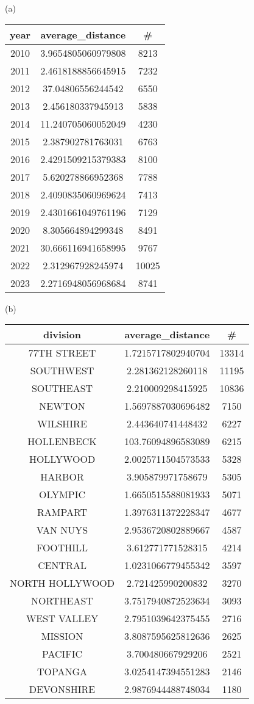 \documentclass{article}
\begin{document}
\begin{center}
(a)
\begin{tabular}{|c|c|c|}
\hline
\textbf{year} & \textbf{average\_distance} & \textbf{\#} \\
\hline
2010 & 3.9654805060979808 & 8213 \\
2011 & 2.4618188856645915 & 7232 \\
2012 & 37.04806556244542 & 6550 \\
2013 & 2.456180337945913 & 5838 \\
2014 & 11.240705060052049 & 4230 \\
2015 & 2.387902781763031 & 6763 \\
2016 & 2.4291509215379383 & 8100 \\
2017 & 5.620278866952368 & 7788 \\
2018 & 2.4090835060969624 & 7413 \\
2019 & 2.4301661049761196 & 7129 \\
2020 & 8.305664894299348 & 8491 \\
2021 & 30.666116941658995 & 9767 \\
2022 & 2.312967928245974 & 10025 \\
2023 & 2.2716948056968684 & 8741 \\
\hline
\end{tabular}
\quad
(b)
\begin{tabular}{|c|c|c|}
\hline
\textbf{division} & \textbf{average\_distance} & \textbf{\#} \\
\hline
77TH STREET & 1.7215717802940704 & 13314 \\
SOUTHWEST & 2.281362128260118 & 11195 \\
SOUTHEAST & 2.210009298415925 & 10836 \\
NEWTON & 1.5697887030696482 & 7150 \\
WILSHIRE & 2.443640741448432 & 6227 \\
HOLLENBECK & 103.76094896583089 & 6215 \\
HOLLYWOOD & 2.0025711504573533 & 5328 \\
HARBOR & 3.905879971758679 & 5305 \\
OLYMPIC & 1.6650515588081933 & 5071 \\
RAMPART & 1.3976311372228347 & 4677 \\
VAN NUYS & 2.9536720802889667 & 4587 \\
FOOTHILL & 3.612771771528315 & 4214 \\
CENTRAL & 1.0231066779455342 & 3597 \\
NORTH HOLLYWOOD & 2.721425990200832 & 3270 \\
NORTHEAST & 3.7517940872523634 & 3093 \\
WEST VALLEY & 2.7951039642375455 & 2716 \\
MISSION & 3.8087595625812636 & 2625 \\
PACIFIC & 3.700480667929206 & 2521 \\
TOPANGA & 3.0254147394551283 & 2146 \\
DEVONSHIRE & 2.9876944488748034 & 1180 \\
\hline
\end{tabular}
\end{center} 
\end{document}
